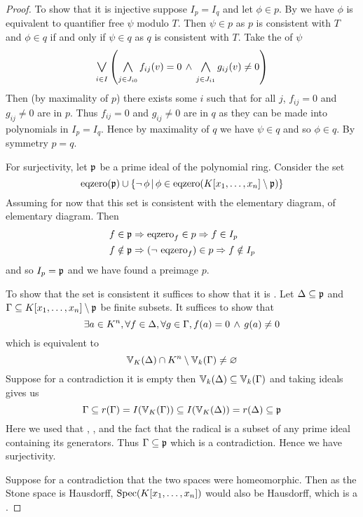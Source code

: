 \begin{proof}
    To show that it is injective suppose $I_p = I_q$ and let $\phi \in p$.
    By  
    we have $\phi$ is equivalent to quantifier free $\psi$ modulo $T$.
    Then $\psi \in p$ as $p$ is consistent with $T$
    and $\phi \in q$ if and only if $\psi \in q$ as $q$ is consistent with $T$.
    Take the  of $\psi$
    \[ 
        \bigor{i \in I}{} 
        \brkt{\bigand{j \in J_{i0}}{} f_{ij}(v) = 0 \AND 
        \bigand{j \in J_{i1}}{} g_{ij}(v) \ne 0}
    \]
    Then (by maximality of $p$) 
    there exists some $i$ such that for all $j$,
    $f_{ij} = 0$ and $g_{ij} \ne 0$
    are in $p$.
    Thus $f_{ij} = 0$ and $g_{ij} \ne 0$ are in $q$ as they can be made into 
    polynomials in $I_p = I_q$.
    Hence by maximality of $q$ we have $\psi \in q$ and so $\phi \in q$.
    By symmetry $p = q$.

    For surjectivity, 
    let $\mathfrak{p}$ be a prime ideal of the polynomial ring.
    Consider the set
    \[  
        \operatorname{eqzero}(\mathfrak{p}) \cup 
        \left\{\neg\, \phi \,|\, \phi \in \operatorname{eqzero}(K[x_1,\dots,x_n] \setminus \mathfrak{p})\right\}
    \]
    Assuming for now that this set is 
    consistent with the elementary diagram, 
     of elementary diagram.
    Then 
    \begin{align*}
        &f \in \mathfrak{p} \Rightarrow \operatorname{eqzero}_f \in p \Rightarrow f \in I_p\\
        &f \notin \mathfrak{p} \Rightarrow (\neg\, \operatorname{eqzero}_f) \in p \Rightarrow f \notin I_p
    \end{align*} 
    and so $I_p = \mathfrak{p}$ and we have found a preimage $p$.

    To show that the set is consistent 
    it suffices to show that it is 
    .
    Let $\Delta \subseteq \mathfrak{p}$ and $\Gamma \subseteq K[x_1,\dots,x_n] \setminus \mathfrak{p}$
    be finite subsets.
    It suffices to show that 
    \[\exists a \in K^n, \forall f \in \Delta, \forall g \in \Gamma, 
    f(a) = 0 \, \land \, g(a) \ne 0\]
    which is equivalent to 
    \[\mathbb{V}_K(\Delta) \cap K^n \setminus \mathbb{V}_k(\Gamma) \ne \varnothing\]
    Suppose for a contradiction it is empty then $\mathbb{V}_k(\Delta) \subseteq \mathbb{V}_k(\Gamma)$
    and taking ideals gives us 
    \[\Gamma \subseteq r(\Gamma) = I(\mathbb{V}_K(\Gamma)) \subseteq I(\mathbb{V}_K(\Delta)) = r(\Delta) \subseteq \mathfrak{p}\]
    Here we used that 
    ,
    , 
    and the fact that the radical
    is a subset of any prime ideal containing its generators.
    Thus $\Gamma \subseteq \mathfrak{p}$ which is a contradiction.
    Hence we have surjectivity.

    Suppose for a contradiction that the two spaces were homeomorphic.
    Then as the Stone space is Hausdorff, 
    $\operatorname{Spec}(K[x_1,\dots,x_n])$ would also be Hausdorff,
    which is a .
\end{proof}
